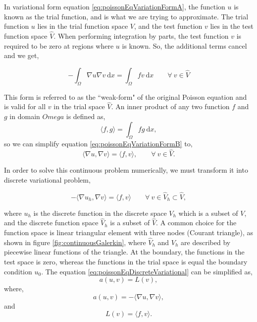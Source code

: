 In variational form equation \ref{eq:poissonEqVariationFormA}, the function $u$ is known as the trial function, and is what we are trying to approximate. The trial function $u$ lies in the trial function space $V$, and the test function $v$ lies in the test function space $\hat{V}$. When performing integration by parts, the test function $v$ is required to be zero at regions where $u$ is known. So, the additional terms cancel and we get,

	\begin{equation}
	- \int_{\Omega} \nabla u \nabla v\ \mathrm{d}x= \int_{\Omega} fv\ \mathrm{d}x \qquad \forall\ v \in \hat{V}
	\label{eq:poissonEqVariationFormB}
	\end{equation}

This form is referred to as the ``weak-form" of the original Poisson equation and is valid for all $v$ in the trial space $\hat{V}$. An inner product of any two function $f$ and $g$ in domain $Omega$ is defined as,
	\begin{equation}
	\langle f,g \rangle = \int_{\Omega}fg\ \mathrm{d}x,
	\end{equation}
so we can simplify equation \ref{eq:poissonEqVariationFormB} to,
	\begin{equation}
	\langle \nabla u,\nabla v \rangle = \langle f,v \rangle, \qquad \forall\ v \in \hat{V}.
	\end{equation}

In order to solve this continuous problem numerically, we must transform it into discrete variational problem,

	\begin{equation}
	-\langle \nabla u_h, \nabla v \rangle = \langle f, v \rangle \qquad \forall\ v \in \hat{V}_h \subset \hat{V},
	\label{eq:poissonEqDiscreteVariational}
	\end{equation}

where $u_h$ is the discrete function in the discrete space $V_h$ which is a subset of $V$, and the discrete function space $\hat{V}_h$ is a subset of $\hat{V}$. A common choice for the function space is linear triangular element with three nodes (Courant triangle), as shown in figure \ref{fig:continuousGalerkin}, where $\hat{V}_h$ and $V_h$ are described by piecewise linear functions of the triangle. At the boundary, the functions in the test space is zero, whereas the functions in the trial space is equal the boundary condition $u_0$.  The equation \ref{eq:poissonEqDiscreteVariational} can be simplified as,
	\begin{equation}
	a\left(u,v\right) = L(v),
	\label{eq:weakForm}
	\end{equation}
where,
	\begin{equation}
	a\left(u,v\right) = - \langle \nabla u, \nabla v \rangle,
	\end{equation}
and
	\begin{equation}
	L(v) = \langle f,v \rangle.
	\end{equation}

